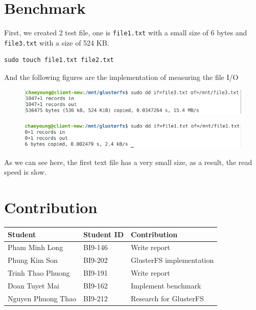\documentclass[times, 10pt]{thesisMDH}
\begin{document}
\section{Benchmark}
First, we created 2 test file, one is \texttt{file1.txt} with a small size of 6 bytes and \texttt{file3.txt} with a size of 524 KB.
\begin{lstlisting}
sudo touch file1.txt file2.txt
\end{lstlisting}
And the following figures are the implementation of measuring the file I/O
\begin{figure}[H]
    \centering
    \includegraphics[width=0.7\linewidth]{images/cap4.png}
\end{figure}
\begin{figure}[H]
    \centering
    \includegraphics[width=0.7\linewidth]{images/cap5.png}
\end{figure}
As we can see here, the first text file has a very small size, as a result, the read speed is slow.


\section{Contribution}
\begin{center}
    \begin{tabular}{|l|l|l|}
        \hline
        \textbf{Student} & \textbf{Student ID} & \textbf{Contribution}\\
        \hline
        Pham Minh Long & BI9-146 & Write report\\
        \hline
        Phung Kim Son & BI9-202 & GlusterFS implementation\\
        \hline
        Trinh Thao Phuong & BI9-191 & Write report \\
        \hline
        Doan Tuyet Mai & BI9-162 & Implement benchmark \\
        \hline
        Nguyen Phuong Thao & BI9-212 & Research for GlusterFS\\
        \hline
    \end{tabular}
\end{center}
\end{document}
